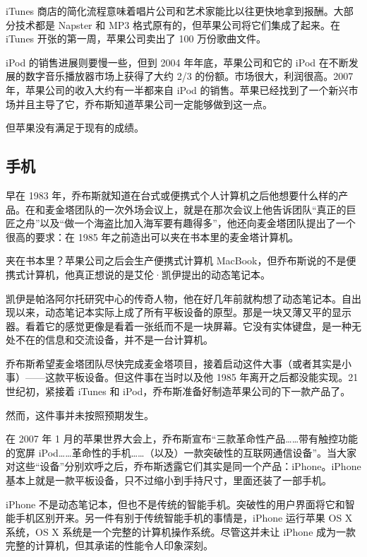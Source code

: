 \documentclass[12pt,UTF8]{ctexbook}
\begin{document}
iTunes 商店的简化流程意味着唱片公司和艺术家能比以往更快地拿到报酬。大部分技术都是 Napster 和 MP3 格式原有的，但苹果公司将它们集成了起来。在 iTunes 开张的第一周，苹果公司卖出了 100 万份歌曲文件。

iPod 的销售进展则要慢一些，但到 2004 年年底，苹果公司和它的 iPod 在不断发展的数字音乐播放器市场上获得了大约 2/3 的份额。市场很大，利润很高。2007 年，苹果公司的收入大约有一半都来自 iPod 的销售。苹果已经找到了一个新兴市场并且主导了它，乔布斯知道苹果公司一定能够做到这一点。

但苹果没有满足于现有的成绩。





\subsection{手机}


早在 1983 年，乔布斯就知道在台式或便携式个人计算机之后他想要什么样的产品。在和麦金塔团队的一次外场会议上，就是在那次会议上他告诉团队“真正的巨匠之舟”以及“做一个海盗比加入海军要有趣得多”，他还向麦金塔团队提出了一个很高的要求：在 1985 年之前造出可以夹在书本里的麦金塔计算机。

夹在书本里？苹果公司之后会生产便携式计算机 MacBook，但乔布斯说的不是便携式计算机，他真正想说的是艾伦·凯伊提出的动态笔记本。

凯伊是帕洛阿尔托研究中心的传奇人物，他在好几年前就构想了动态笔记本。自出现以来，动态笔记本实际上成了所有平板设备的原型。那是一块又薄又平的显示器。看着它的感觉更像是看着一张纸而不是一块屏幕。它没有实体键盘，是一种无处不在的信息和交流设备，并不是一台计算机。

乔布斯希望麦金塔团队尽快完成麦金塔项目，接着启动这件大事（或者其实是小事）——这款平板设备。但这件事在当时以及他 1985 年离开之后都没能实现。21 世纪初，紧接着 iTunes 和 iPod，乔布斯准备好制造苹果公司的下一款产品了。

然而，这件事并未按照预期发生。

在 2007 年 1 月的苹果世界大会上，乔布斯宣布“三款革命性产品……带有触控功能的宽屏 iPod……革命性的手机……（以及）一款突破性的互联网通信设备”。当大家对这些“设备”分别欢呼之后，乔布斯透露它们其实是同一个产品：iPhone。iPhone 基本上就是一款平板设备，只不过缩小到手持尺寸，里面还装了一部手机。

iPhone 不是动态笔记本，但也不是传统的智能手机。突破性的用户界面将它和智能手机区别开来。另一件有别于传统智能手机的事情是，iPhone 运行苹果 OS X 系统，OS X 系统是一个完整的计算机操作系统。尽管这并未让 iPhone 成为一款完整的计算机，但其承诺的性能令人印象深刻。
\end{document}
